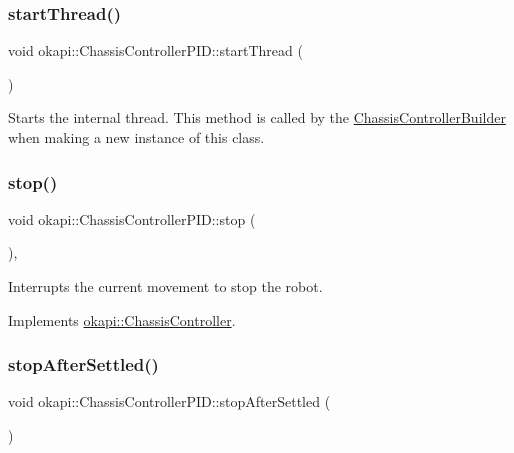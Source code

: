\subsubsection{\texorpdfstring{startThread()}{startThread()}}
{\footnotesize\ttfamily void okapi\+::\+Chassis\+Controller\+P\+I\+D\+::start\+Thread (\begin{DoxyParamCaption}{ }\end{DoxyParamCaption})}

Starts the internal thread. This method is called by the \mbox{\hyperlink{classokapi_1_1ChassisControllerBuilder}{Chassis\+Controller\+Builder}} when making a new instance of this class. \mbox{\label{classokapi_1_1ChassisControllerPID_a852462fc20fb2322bbb3fd984b01a121}} 
\subsubsection{\texorpdfstring{stop()}{stop()}}
{\footnotesize\ttfamily void okapi\+::\+Chassis\+Controller\+P\+I\+D\+::stop (\begin{DoxyParamCaption}{ }\end{DoxyParamCaption})\hspace{0.3cm}{\ttfamily [override]}, {\ttfamily [virtual]}}

Interrupts the current movement to stop the robot. 

Implements \mbox{\hyperlink{classokapi_1_1ChassisController_ac67edbbbe1c8480c4503b9875a3719cd}{okapi\+::\+Chassis\+Controller}}.

\mbox{\label{classokapi_1_1ChassisControllerPID_ac8dffc9df4025ece0303194a0fbc58ff}} 
\subsubsection{\texorpdfstring{stopAfterSettled()}{stopAfterSettled()}}
{\footnotesize\ttfamily void okapi\+::\+Chassis\+Controller\+P\+I\+D\+::stop\+After\+Settled (\begin{DoxyParamCaption}{ }\end{DoxyParamCaption})\hspace{0.3cm}{\ttfamily [protected]}}

